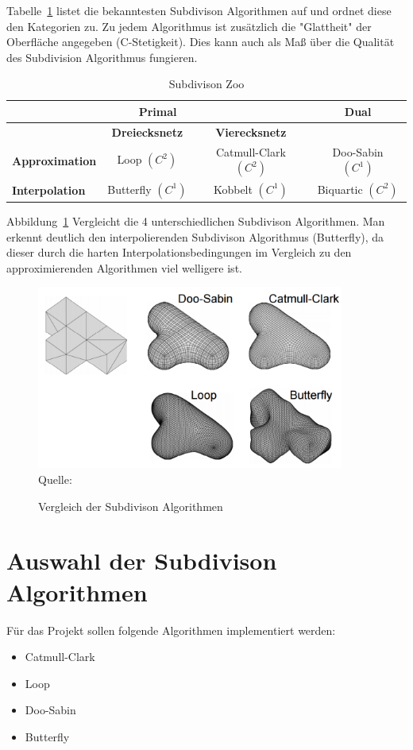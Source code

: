 Tabelle~\ref{tab:sd_comp} listet die bekanntesten Subdivison Algorithmen auf und ordnet diese den Kategorien zu.
Zu jedem Algorithmus ist zusätzlich die "Glattheit" der Oberfläche angegeben (C-Stetigkeit).
Dies kann auch als Maß über die Qualität des Subdivision Algorithmus fungieren.
\begin{table}[h]
\caption{Subdivison Zoo}
\center
\begin{tabular}{|l|c|c|c}
\toprule
\multicolumn{3}{c|}{\textbf{Primal}} & \textbf{Dual}\\
\midrule
& \textbf{Dreiecksnetz} & \textbf{Vierecksnetz} & \\
\midrule
\textbf{Approximation} & Loop \((C^2)\) & Catmull-Clark \((C^2)\) & Doo-Sabin \((C^1)\) \\
\textbf{Interpolation} & Butterfly \((C^1)\) & Kobbelt \((C^1)\) & Biquartic \((C^2)\) \\
\bottomrule
\end{tabular}
\label{tab:sd_comp}
\end{table}

Abbildung~\ref{fig:sd_comp} Vergleicht die 4 unterschiedlichen Subdivison Algorithmen.
Man erkennt deutlich den interpolierenden Subdivison Algorithmus (Butterfly),
da dieser durch die harten Interpolationsbedingungen im Vergleich zu den approximierenden Algorithmen viel welligere ist.
\begin{figure}[h]
  \caption{Vergleich der Subdivison Algorithmen}
  \centering
  \includegraphics[width=0.9\textwidth]{content/media/sd_overview.png}
  \\Quelle: \cite{Standford.24.07.2015}
  \label{fig:sd_comp}
\end{figure}

\section{Auswahl der Subdivison Algorithmen}

Für das Projekt sollen folgende Algorithmen implementiert werden:
\begin{itemize}
	\item Catmull-Clark
	\item Loop
	\item Doo-Sabin
	\item Butterfly
\end{itemize}


